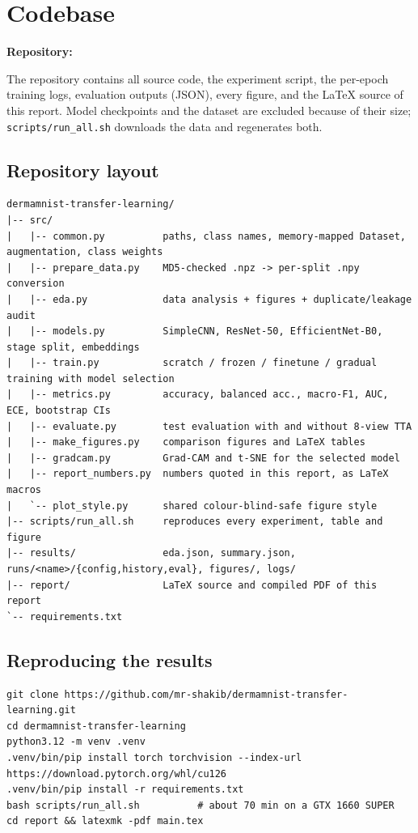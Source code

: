 \section{Codebase}
\label{sec:codebase}

\textbf{Repository:} \href{\repo}{\texttt{\repo}}

The repository contains all source code, the experiment script, the per-epoch training logs, evaluation
outputs (JSON), every figure, and the \LaTeX{} source of this report. Model checkpoints and the dataset are
excluded because of their size; \texttt{scripts/run\_all.sh} downloads the data and regenerates both.

\subsection*{Repository layout}
\begin{lstlisting}
dermamnist-transfer-learning/
|-- src/
|   |-- common.py          paths, class names, memory-mapped Dataset, augmentation, class weights
|   |-- prepare_data.py    MD5-checked .npz -> per-split .npy conversion
|   |-- eda.py             data analysis + figures + duplicate/leakage audit
|   |-- models.py          SimpleCNN, ResNet-50, EfficientNet-B0, stage split, embeddings
|   |-- train.py           scratch / frozen / finetune / gradual training with model selection
|   |-- metrics.py         accuracy, balanced acc., macro-F1, AUC, ECE, bootstrap CIs
|   |-- evaluate.py        test evaluation with and without 8-view TTA
|   |-- make_figures.py    comparison figures and LaTeX tables
|   |-- gradcam.py         Grad-CAM and t-SNE for the selected model
|   |-- report_numbers.py  numbers quoted in this report, as LaTeX macros
|   `-- plot_style.py      shared colour-blind-safe figure style
|-- scripts/run_all.sh     reproduces every experiment, table and figure
|-- results/               eda.json, summary.json, runs/<name>/{config,history,eval}, figures/, logs/
|-- report/                LaTeX source and compiled PDF of this report
`-- requirements.txt
\end{lstlisting}

\subsection*{Reproducing the results}
\begin{lstlisting}
git clone https://github.com/mr-shakib/dermamnist-transfer-learning.git
cd dermamnist-transfer-learning
python3.12 -m venv .venv
.venv/bin/pip install torch torchvision --index-url https://download.pytorch.org/whl/cu126
.venv/bin/pip install -r requirements.txt
bash scripts/run_all.sh          # about 70 min on a GTX 1660 SUPER
cd report && latexmk -pdf main.tex
\end{lstlisting}
